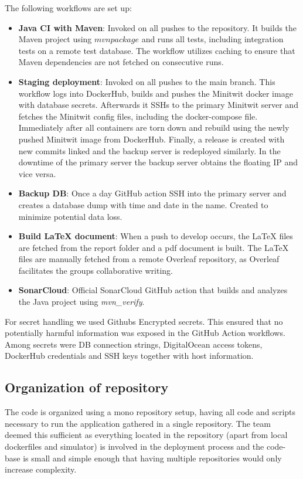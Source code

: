 The following workflows are set up:
\begin{itemize}
    \item \textbf{Java CI with Maven}: Invoked on all pushes to the repository. It builds the Maven project using $mvn package$ and runs all tests, including integration tests on a remote test database. The workflow utilizes caching to ensure that Maven dependencies are not fetched on consecutive runs. 
    \item \textbf{Staging deployment}: Invoked on all pushes to the main branch. This workflow logs into DockerHub, builds and pushes the Minitwit docker image with database secrets. Afterwards it SSHs to the primary Minitwit server and fetches the Minitwit config files, including the docker-compose file. Immediately after all containers are torn down and rebuild using the newly pushed Minitwit image from DockerHub. Finally, a release is created with new commits linked and the backup server is redeployed similarly. In the downtime of the primary server the backup server obtains the floating IP and vice versa. 
    \item \textbf{Backup DB}: Once a day GitHub action SSH into the primary server and creates a database dump with time and date in the name. Created to minimize potential data loss.
    \item \textbf{Build LaTeX document}: When a push to develop occurs, the LaTeX files are fetched from the report folder and a pdf document is built. The LaTeX files are manually fetched from a remote Overleaf repository, as Overleaf facilitates the groups collaborative writing. 
    \item \textbf{SonarCloud}: Official SonarCloud GitHub action that builds and analyzes the Java project using \textit{mvn\_verify}. 
\end{itemize}
For secret handling we used Githubs Encrypted secrets. This ensured that no potentially harmful information was exposed in the GitHub Action workflows. Among secrets were DB connection strings, DigitalOcean access tokens, DockerHub credentials and SSH keys together with host information.


\subsection{Organization of repository}
The code is organized using a mono repository setup, having all code and scripts necessary to run the application gathered in a single repository. The team deemed this sufficient as everything located in the repository (apart from local dockerfiles and simulator) is involved in the deployment process and the code-base is small and simple enough that having multiple repositories would only increase complexity. 


